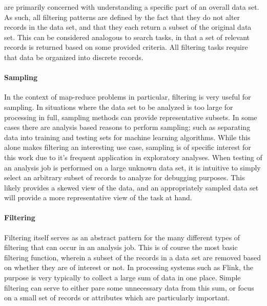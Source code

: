 are primarily concerned with understanding a specific part of an overall data set. As such, all filtering patterns are defined by the fact that they do not alter records in the data set, and that they each return a subset of the original data set. This can be considered analogous to search tasks, in that a set of relevant records is returned based on some provided criteria. All filtering tasks require that data be organized into discrete records.

\paragraph{Sampling}
In the context of map-reduce problems in particular, filtering is very useful for sampling. In situations where the data set to be analyzed is too large for processing in full, sampling methods can provide representative subsets. In some cases there are analysis based reasons to perform sampling; such as separating data into training and testing sets for machine learning algorithms. While this alone makes filtering an interesting use case, sampling is of specific interest for this work due to it's frequent application in exploratory analyses. When testing of an analysis job is performed on a large unknown data set, it is intuitive to simply select an arbitrary subset of records to analyze for debugging purposes. This likely provides a skewed view of the data, and an appropriately sampled data set will provide a more representative view of the task at hand. 

\paragraph{Filtering}
Filtering itself serves as an abstract pattern for the many different types of filtering that can occur in an analysis job. This is of course the most basic filtering function, wherein a subset of the records in a data set are removed based on whether they are of interest or not. In processing systems such as Flink, the purpose is very typically to collect a large sum of data in one place. Simple filtering can serve to either pare some unnecessary data from this sum, or focus on a small set of records or attributes which are particularly important.

